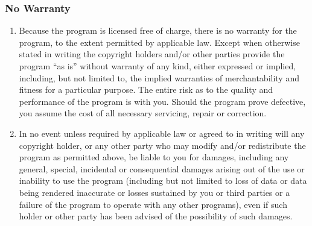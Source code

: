 \subsubsection{No Warranty}

\begin{enumerate}
        \addtocounter{enumi}{9}
    \item Because the program is licensed free of charge, there is no
        warranty for the program, to the extent permitted by applicable law.
        Except when otherwise stated in writing the copyright holders and/or
        other parties provide the program ``as is'' without warranty of any
        kind, either expressed or implied, including, but not limited to, the
        implied warranties of merchantability and fitness for a particular
        purpose.  The entire risk as to the quality and performance of the
        program is with you. Should the program prove defective, you assume
        the cost of all necessary servicing, repair or correction.
    \item In no event unless required by applicable law or agreed to in
        writing will any copyright holder, or any other party who may modify
        and/or redistribute the program as permitted above, be liable to you
        for damages, including any general, special, incidental or
        consequential damages arising out of the use or inability to use the
        program (including but not limited to loss of data or data being
        rendered inaccurate or losses sustained by you or third parties or a
        failure of the program to operate with any other programs), even if
        such holder or other party has been advised of the possibility of
        such damages.
\end{enumerate}


\providecommand{\LPPLsection}{\subsection}
\providecommand{\LPPLsubsection}{\subsubsection}
\providecommand{\LPPLsubsubsection}{\subsubsection}
\providecommand{\LPPLparagraph}{\paragraph}


